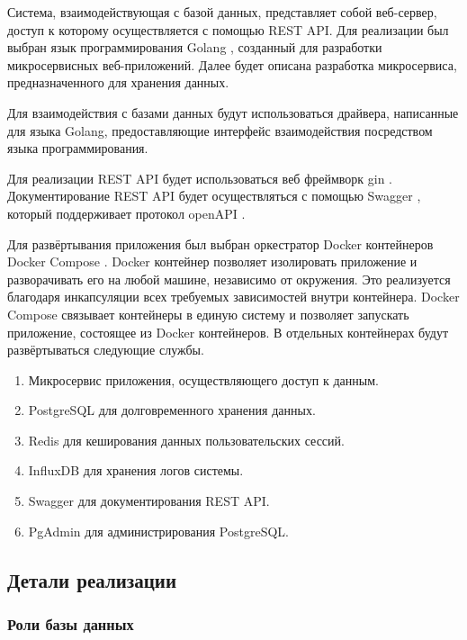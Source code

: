 Система, взаимодействующая с базой данных, представляет собой веб-сервер, доступ к которому осуществляется с помощью REST API. Для реализации был выбран язык программирования Golang \cite{Golang}, созданный для разработки микросервисных веб-приложений. Далее будет описана разработка микросервиса, предназначенного для хранения данных. 

Для взаимодействия с базами данных будут использоваться драйвера, написанные для языка Golang, предоставляющие интерфейс взаимодействия посредством языка программирования.

Для реализации REST API будет использоваться веб фреймворк gin \cite{Gin}. Документирование REST API будет осуществляться с помощью Swagger \cite{Swagger}, который поддерживает протокол openAPI \cite{openAPI}.

Для развёртывания приложения был выбран оркестратор Docker контейнеров Docker Compose \cite{Docker_compose}. Docker контейнер позволяет изолировать приложение и разворачивать его на любой машине, независимо от окружения. Это реализуется благодаря инкапсуляции всех требуемых зависимостей внутри контейнера. Docker Compose связывает контейнеры в единую систему и позволяет запускать приложение, состоящее из Docker контейнеров. В отдельных контейнерах будут развёртываться следующие службы.

\begin{enumerate}[label*=\arabic*.]
	\item Микросервис приложения, осуществляющего доступ к данным.
	\item PostgreSQL для долговременного хранения данных.
	\item Redis для кеширования данных пользовательских сессий.
	\item InfluxDB для хранения логов системы.
	\item Swagger для документирования REST API.
	\item PgAdmin для администрирования PostgreSQL.
\end{enumerate}




\subsection{Детали реализации}

\subsubsection{Роли базы данных}

